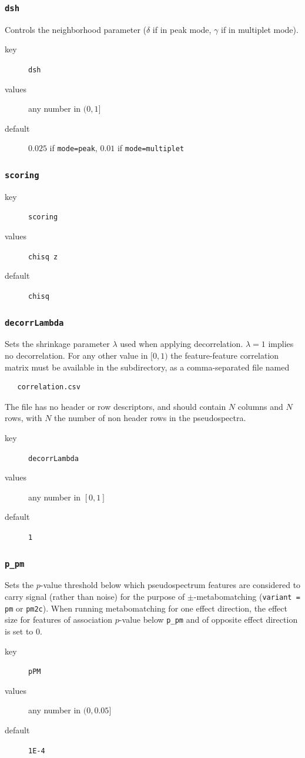 \documentclass[a4paper,11pt]{article}
\begin{document}
\subsubsection{ \texttt{dsh}}
Controls the neighborhood parameter ($\delta$ if in peak mode, $\gamma$ if in multiplet mode).
\begin{description}
	\item[key] \texttt{dsh}
	\item[values] any number in $(0,1]$
	\item[default] $0.025$ if \texttt{mode=peak}, $0.01$ if \texttt{mode=multiplet}
\end{description}
\subsubsection{ \texttt{scoring}}
\begin{description}
	\item[key] \texttt{scoring}
	\item[values] \texttt{chisq z}
	\item[default] \texttt{chisq}
\end{description}
\subsubsection{ \texttt{decorrLambda}}
Sets the shrinkage parameter $\lambda$ used when applying decorrelation. $\lambda=1$ implies no decorrelation. For any other value in $[0,1)$ the feature-feature correlation matrix must be available in the subdirectory, as a comma-separated file named
\begin{verbatim}
   correlation.csv
\end{verbatim}
The file has no header or row descriptors, and should contain $N$ columns and $N$ rows, with $N$ the number of non header rows in the pseudospectra.
\begin{description}
	\item[key] \texttt{decorrLambda}
	\item[values] any number in $[0,1]$
	\item[default] \texttt{1}
\end{description}
\subsubsection{ \texttt{p\_pm}}
Sets the $p$-value threshold below which pseudospectrum features are considered to carry signal (rather than noise) for the purpose of $\pm$-metabomatching (\texttt{variant = pm} or \texttt{pm2c}). When running metabomatching for one effect direction, the effect size for features of association $p$-value below \texttt{p\_pm} and of opposite effect direction is set to 0.
\begin{description}
	\item[key] \texttt{pPM}
	\item[values] any number in $(0,0.05]$
	\item[default] \texttt{1E-4}	
\end{description} 
\end{document}
